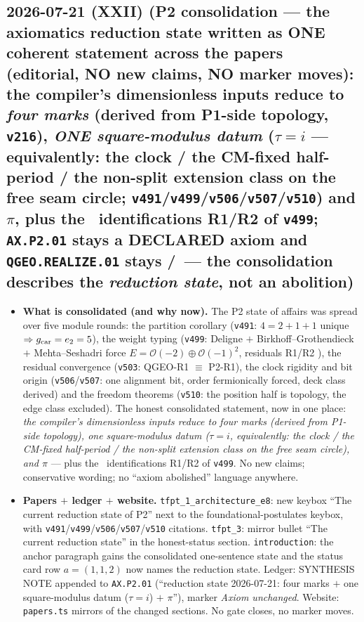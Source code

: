 \subsection*{2026-07-21 (XXII) (P2 consolidation --- the axiomatics reduction state written as ONE coherent statement across the papers (editorial, NO new claims, NO marker moves): the compiler's dimensionless inputs reduce to \emph{four marks} (derived from P1-side topology, \texttt{v216}), \emph{ONE square-modulus datum} ($\tau=i$ --- equivalently: the clock / the CM-fixed half-period / the non-split extension class on the free seam circle; \texttt{v491}/\texttt{v499}/\texttt{v506}/\texttt{v507}/\texttt{v510}) and $\pi$, plus the \mC\ identifications R1/R2 of \texttt{v499}; \texttt{AX.P2.01} stays a DECLARED axiom and \texttt{QGEO.REALIZE.01} stays \mC/\mO\ --- the consolidation describes the \emph{reduction state}, not an abolition)}
\begin{itemize}[leftmargin=1.5em]
\item \textbf{What is consolidated (and why now).} The P2 state of affairs was spread over five module rounds:
the partition corollary (\texttt{v491}: $4=2{+}1{+}1$ unique $\Rightarrow g_{\mathrm{car}}=e_2=5$), the weight
typing (\texttt{v499}: Deligne $+$ Birkhoff--Grothendieck $+$ Mehta--Seshadri force
$E=\mathcal O(-2){\oplus}\mathcal O(-1)^2$, residuals R1/R2 \mC), the residual convergence
(\texttt{v503}: QGEO-R1 $\equiv$ P2-R1), the clock rigidity and bit origin (\texttt{v506}/\texttt{v507}:
one alignment bit, order fermionically forced, deck class derived) and the freedom theorems
(\texttt{v510}: the position half is topology, the edge class excluded). The honest consolidated
statement, now in one place: \emph{the compiler's dimensionless inputs reduce to four marks (derived
from P1-side topology), one square-modulus datum ($\tau=i$, equivalently: the clock / the CM-fixed
half-period / the non-split extension class on the free seam circle), and $\pi$} --- plus the \mC\
identifications R1/R2 of \texttt{v499}. No new claims; conservative wording; no ``axiom abolished''
language anywhere.
\item \textbf{Papers $+$ ledger $+$ website.} \texttt{tfpt\_1\_architecture\_e8}: new keybox ``The
current reduction state of P2'' next to the foundational-postulates keybox, with
\texttt{v491}/\texttt{v499}/\texttt{v506}/\texttt{v507}/\texttt{v510} citations.
\texttt{tfpt\_3}: mirror bullet ``The current reduction state'' in the honest-status section.
\texttt{introduction}: the anchor paragraph gains the consolidated one-sentence state and the status
card row $a=(1,1,2)$ now names the reduction state. Ledger: SYNTHESIS NOTE appended to
\texttt{AX.P2.01} (``reduction state 2026-07-21: four marks $+$ one square-modulus datum ($\tau=i$)
$+$ $\pi$''), marker \emph{Axiom unchanged}. Website: \texttt{papers.ts} mirrors of the changed
sections. No gate closes, no marker moves.
\end{itemize}

